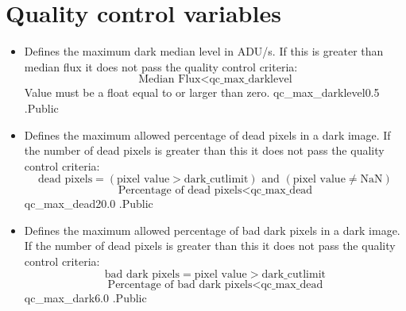 \clearpage
\newpage
\section{Quality control variables}
\label{ch:variables:qualitycontrol}

\begin{itemize}

\item {} 
{Defines the maximum dark median level in ADU/s. If this is greater than median flux it does not pass the quality control criteria:
\begin{equation}
\text{Median Flux} < \text{qc\_max\_darklevel}
\end{equation}
Value must be a float equal to or larger than zero. 
}
{qc\_max\_darklevel}{0.5}
{\calDARK}{\constantsfile}{\calDARK.\progMAIN}{Public}


\item {} 
{Defines the maximum allowed percentage of dead pixels in a dark image. If the number of dead pixels is greater than this it does not pass the quality control criteria:
\begin{equation}
\text{dead pixels} = (\text{pixel value} > \text{dark\_cutlimit}) \text{ and } (\text{pixel value} \neq \text{NaN})
\end{equation}
\begin{equation}
\text{Percentage of dead pixels} < \text{qc\_max\_dead}
\end{equation}
}
{qc\_max\_dead}{20.0}
{\calDARK}{\constantsfile}{\calDARK.\progMAIN}{Public}


\item {} 
{Defines the maximum allowed percentage of bad dark pixels in a dark image. If the number of dead pixels is greater than this it does not pass the quality control criteria:
\begin{equation}
\text{bad dark pixels} = \text{pixel value} > \text{dark\_cutlimit}
\end{equation}
\begin{equation}
\text{Percentage of bad dark pixels} < \text{qc\_max\_dead}
\end{equation}
}
{qc\_max\_dark}{6.0}
{\calDARK}{\constantsfile}{\calDARK.\progMAIN}{Public}



\end{itemize}
